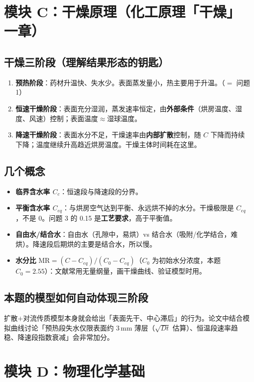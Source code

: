 \documentclass[12pt,a4paper]{ctexart}
\begin{document}
\section{模块 C：干燥原理（化工原理「干燥」一章）}

\subsection{干燥三阶段（理解结果形态的钥匙）}
\begin{enumerate}[leftmargin=2.5em]
\item \textbf{预热阶段}：药材升温快、失水少。表面蒸发量小，热主要用于升温。（$=$ 问题 1）
\item \textbf{恒速干燥阶段}：表面充分湿润，蒸发速率恒定，由\textbf{外部条件}（烘房温度、湿度、风速）控制；表面温度$\approx$湿球温度。
\item \textbf{降速干燥阶段}：表面水分不足，干燥速率由\textbf{内部扩散}控制，随 $C$ 下降而持续下降；温度继续升高趋近烘房温度。干燥主体时间耗在这里。
\end{enumerate}

\subsection{几个概念}
\begin{itemize}
\item \textbf{临界含水率 $C_c$}：恒速段与降速段的分界。
\item \textbf{平衡含水率 $C_{eq}$}：与烘房空气达到平衡、永远烘不掉的水分。干燥极限是 $C_{eq}$，不是 0。问题 3 的 0.15 是\textbf{工艺要求}，高于平衡值。
\item \textbf{自由水/结合水}：自由水（孔隙中，易烘）vs 结合水（吸附/化学结合，难烘）。降速段后期烘的主要是结合水，所以慢。
\item \textbf{水分比} $\mathrm{MR}=(C-C_{eq})/(C_0-C_{eq})$（$C_0$ 为初始水分浓度，本题 $C_0=2.55$）：文献常用无量纲量，画干燥曲线、验证模型时用。
\end{itemize}

\subsection{本题的模型如何自动体现三阶段}
扩散$+$对流传质模型本身就会给出「表面先干、中心滞后」的行为。论文中结合模拟曲线讨论「预热段失水仅限表面约 3\,mm 薄层（$\sqrt{Dt}$ 估算）、恒温段速率趋稳、降速段指数衰减」会非常加分。

\section{模块 D：物理化学基础}
\end{document}
